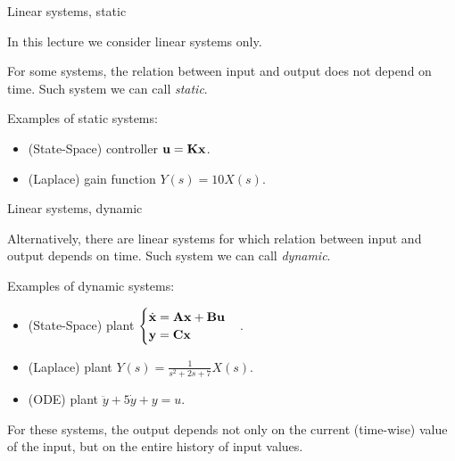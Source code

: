 \documentclass{beamer}
\begin{document}
\begin{frame}{Linear systems, static}
	\begin{flushleft}
		
		In this lecture we consider linear systems only. 
		
		\bigskip
		
		For some systems, the relation between input and output does not depend on time. Such system we can call \emph{static}.
		
		\bigskip
		
		Examples of static systems:
		
		\begin{itemize}
			\item (State-Space) controller $\mathbf{u} = \mathbf{K}\mathbf{x}$. 
			
			\item (Laplace) gain function $Y(s) = 10 X(s)$.
		\end{itemize}
		
	\end{flushleft}
\end{frame}


\begin{frame}{Linear systems, dynamic}
	\begin{flushleft}
		
		Alternatively, there are linear systems for which relation between input and output depends on time. Such system we can call \emph{dynamic}.
		
		\bigskip
		
		Examples of dynamic systems:
		
		\begin{itemize}
			\item (State-Space) plant $\begin{cases}
				\dot {\mathbf{x}} = \mathbf{A} \mathbf{x} + \mathbf{B} \mathbf{u} \\
				\mathbf{y} = \mathbf{C} \mathbf{x}
			\end{cases}$.
			
			\item (Laplace) plant $Y(s) = \frac{1}{s^2 + 2s + 7} X(s)$.
			
			\item (ODE) plant $\ddot y + 5 \dot y + y = u$.
		\end{itemize}
		
		\bigskip
		
		For these systems, the output depends not only on the current (time-wise) value of the input, but on the entire history of input values.
		
	\end{flushleft}
\end{frame}
\end{document}
